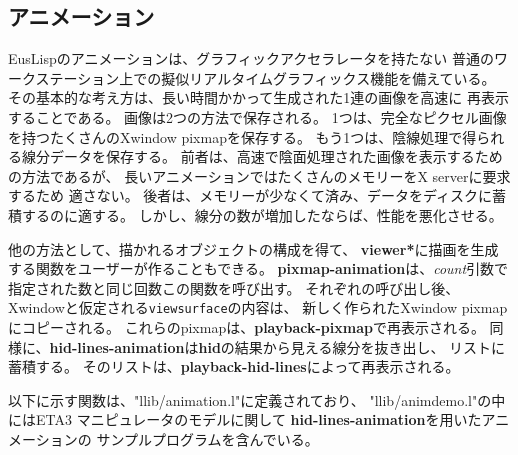 \subsection{アニメーション}
EusLispのアニメーションは、グラフィックアクセラレータを持たない
普通のワークステーション上での擬似リアルタイムグラフィックス機能を備えている。
その基本的な考え方は、長い時間かかって生成された1連の画像を高速に
再表示することである。
画像は2つの方法で保存される。
1つは、完全なピクセル画像を持つたくさんのXwindow pixmapを保存する。
もう1つは、陰線処理で得られる線分データを保存する。
前者は、高速で陰面処理された画像を表示するための方法であるが、
長いアニメーションではたくさんのメモリーをX serverに要求するため
適さない。
後者は、メモリーが少なくて済み、データをディスクに蓄積するのに適する。
しかし、線分の数が増加したならば、性能を悪化させる。

他の方法として、描かれるオブジェクトの構成を得て、
{\bf *viewer*}に描画を生成する関数をユーザーが作ることもできる。
{\bf pixmap-animation}は、{\em count}引数で指定された数と同じ回数この関数を呼び出す。
それぞれの呼び出し後、Xwindowと仮定される{\tt viewsurface}の内容は、
新しく作られたXwindow pixmapにコピーされる。
これらのpixmapは、{\bf playback-pixmap}で再表示される。
同様に、{\bf hid-lines-animation}は{\bf hid}の結果から見える線分を抜き出し、
リストに蓄積する。
そのリストは、{\bf playback-hid-lines}によって再表示される。

以下に示す関数は、"llib/animation.l"に定義されており、
"llib/animdemo.l"の中にはETA3 マニピュレータのモデルに関して
{\bf hid-lines-animation}を用いたアニメーションの
サンプルプログラムを含んでいる。

\begin{refdesc}






\end{refdesc}

\newpage
